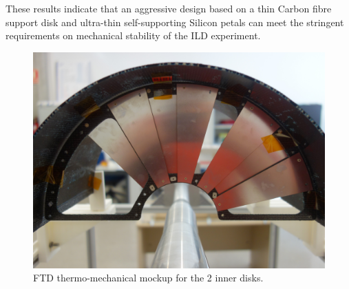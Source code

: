 These results indicate that an aggressive design based on a thin Carbon fibre
support disk and ultra-thin self-supporting Silicon petals can meet the 
stringent requirements on mechanical stability of the ILD experiment.
\begin{figure}[t!]
\centering
\includegraphics[width=0.6\hsize]{Detector/fig/FTD_mockup.jpg}
\caption{FTD thermo-mechanical mockup for the 2 inner disks.}
\label{fig:det:FTD_mockup}
\end{figure}